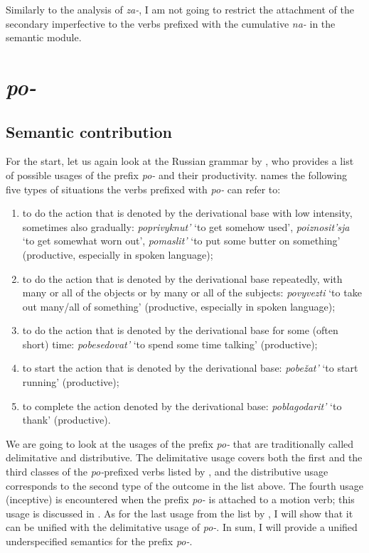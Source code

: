 Similarly to the analysis of \textit{za-}, I am not going to restrict the attachment of the secondary imperfective to the verbs prefixed with the cumulative \textit{na-} in the semantic module.

\section{\textit{po-}}\label{subsection:semantics:po}
\subsection{Semantic contribution} For the start, let us again look at the Russian grammar by \citet{Shvedova:82}, who provides a list of possible usages of the prefix \textit{po-} and their productivity. \citet[364--365]{Shvedova:82} names the following five types of situations the verbs prefixed with \textit{po-} can refer to:
\begin{enumerate}
\item to do the action that is denoted by the derivational base with low intensity, sometimes also gradually: \textit{poprivyknut'} `to get somehow used', \textit{po\-izno\-sit'sja} `to get somewhat worn out', \textit{pomaslit'} `to put some butter on something'  (productive, especially in spoken language);
\item to do the action that is denoted by the derivational base repeatedly, with many or all of the objects or by many or all of the subjects: \textit{povyvezti} `to take out many/all of something' (productive, especially in spoken language);
\item to do the action that is denoted by the derivational base for some (often short) time: \textit{pobesedovat'} `to spend some time talking' (productive);
\item to start the action that is denoted by the derivational base: \textit{pobe\v{z}at'} `to start running' (productive);
\item to complete the action denoted by the derivational base: \textit{poblagodarit'} `to thank' (productive).
\end{enumerate}

We are going to look at the usages of the prefix \textit{po-} that are traditionally called delimitative and distributive. The delimitative usage covers both the first and the third classes of the \textit{po-}prefixed verbs listed by \citet{Shvedova:82}, and the distributive usage corresponds to the second type of the outcome in the list above. The fourth usage (inceptive) is encountered when the prefix \textit{po-} is attached to a motion verb; this usage is discussed in \citealt{ZinovaOsswald:paper}. As for the last usage from the list by \citet{Shvedova:82}, I will show that it can be unified with the delimitative usage of \textit{po-}. In sum, I will provide a unified underspecified semantics for the prefix \textit{po-}.

